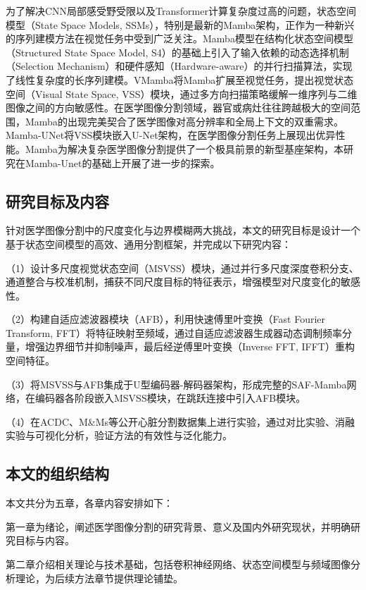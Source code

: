 \documentclass[12pt, a4paper, twoside]{article}
\begin{document}
为了解决CNN局部感受野受限以及Transformer计算复杂度过高的问题，状态空间模型（State Space Models, SSMs），特别是最新的Mamba架构，正作为一种新兴的序列建模方法在视觉任务中受到广泛关注。Mamba模型在结构化状态空间模型（Structured State Space Model, S4）的基础上引入了输入依赖的动态选择机制（Selection Mechanism）和硬件感知（Hardware-aware）的并行扫描算法，实现了线性复杂度的长序列建模。VMamba将Mamba扩展至视觉任务，提出视觉状态空间（Visual State Space, VSS）模块，通过多方向扫描策略缓解一维序列与二维图像之间的方向敏感性。在医学图像分割领域，器官或病灶往往跨越极大的空间范围，Mamba的出现完美契合了医学图像对高分辨率和全局上下文的双重需求。Mamba-UNet将VSS模块嵌入U-Net架构，在医学图像分割任务上展现出优异性能。Mamba为解决复杂医学图像分割提供了一个极具前景的新型基座架构，本研究在Mamba-Unet的基础上开展了进一步的探索。


\subsection{研究目标及内容}

针对医学图像分割中的尺度变化与边界模糊两大挑战，本文的研究目标是设计一个基于状态空间模型的高效、通用分割框架，并完成以下研究内容：

（1）设计多尺度视觉状态空间（MSVSS）模块，通过并行多尺度深度卷积分支、通道整合与校准机制，捕获不同尺度目标的特征表示，增强模型对尺度变化的敏感性。

（2）构建自适应滤波器模块（AFB），利用快速傅里叶变换（Fast Fourier Transform, FFT）将特征映射至频域，通过自适应滤波器生成器动态调制频率分量，增强边界细节并抑制噪声，最后经逆傅里叶变换（Inverse FFT, IFFT）重构空间特征。

（3）将MSVSS与AFB集成于U型编码器-解码器架构，形成完整的SAF-Mamba网络，在编码器各阶段嵌入MSVSS模块，在跳跃连接中引入AFB模块。

（4）在ACDC、M\&Ms等公开心脏分割数据集上进行实验，通过对比实验、消融实验与可视化分析，验证方法的有效性与泛化能力。

\subsection{本文的组织结构}

本文共分为五章，各章内容安排如下：

第一章为绪论，阐述医学图像分割的研究背景、意义及国内外研究现状，并明确研究目标与内容。

第二章介绍相关理论与技术基础，包括卷积神经网络、状态空间模型与频域图像分析理论，为后续方法章节提供理论铺垫。
\end{document}
